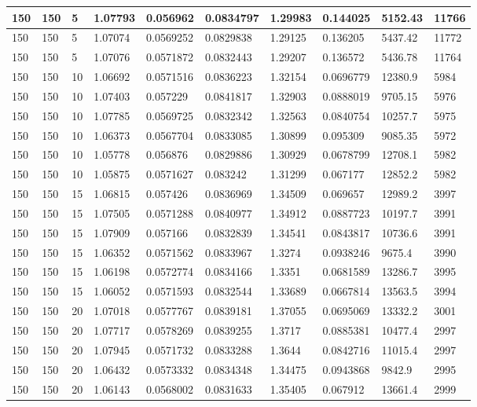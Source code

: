 \begin{landscape}
\begin{longtable}{ | l | l | l | l | l | l | l | l | l | l | }
150 & 150 & 5 & 1.07793 & 0.056962 & 0.0834797 & 1.29983 & 0.144025 & 5152.43 & 11766\\ \hline
150 & 150 & 5 & 1.07074 & 0.0569252 & 0.0829838 & 1.29125 & 0.136205 & 5437.42 & 11772\\ \hline
150 & 150 & 5 & 1.07076 & 0.0571872 & 0.0832443 & 1.29207 & 0.136572 & 5436.78 & 11764\\ \hline
150 & 150 & 10 & 1.06692 & 0.0571516 & 0.0836223 & 1.32154 & 0.0696779 & 12380.9 & 5984\\ \hline
150 & 150 & 10 & 1.07403 & 0.057229 & 0.0841817 & 1.32903 & 0.0888019 & 9705.15 & 5976\\ \hline
150 & 150 & 10 & 1.07785 & 0.0569725 & 0.0832342 & 1.32563 & 0.0840754 & 10257.7 & 5975\\ \hline
150 & 150 & 10 & 1.06373 & 0.0567704 & 0.0833085 & 1.30899 & 0.095309 & 9085.35 & 5972\\ \hline
150 & 150 & 10 & 1.05778 & 0.056876 & 0.0829886 & 1.30929 & 0.0678799 & 12708.1 & 5982\\ \hline
150 & 150 & 10 & 1.05875 & 0.0571627 & 0.083242 & 1.31299 & 0.067177 & 12852.2 & 5982\\ \hline
150 & 150 & 15 & 1.06815 & 0.057426 & 0.0836969 & 1.34509 & 0.069657 & 12989.2 & 3997\\ \hline
150 & 150 & 15 & 1.07505 & 0.0571288 & 0.0840977 & 1.34912 & 0.0887723 & 10197.7 & 3991\\ \hline
150 & 150 & 15 & 1.07909 & 0.057166 & 0.0832839 & 1.34541 & 0.0843817 & 10736.6 & 3991\\ \hline
150 & 150 & 15 & 1.06352 & 0.0571562 & 0.0833967 & 1.3274 & 0.0938246 & 9675.4 & 3990\\ \hline
150 & 150 & 15 & 1.06198 & 0.0572774 & 0.0834166 & 1.3351 & 0.0681589 & 13286.7 & 3995\\ \hline
150 & 150 & 15 & 1.06052 & 0.0571593 & 0.0832544 & 1.33689 & 0.0667814 & 13563.5 & 3994\\ \hline
150 & 150 & 20 & 1.07018 & 0.0577767 & 0.0839181 & 1.37055 & 0.0695069 & 13332.2 & 3001\\ \hline
150 & 150 & 20 & 1.07717 & 0.0578269 & 0.0839255 & 1.3717 & 0.0885381 & 10477.4 & 2997\\ \hline
150 & 150 & 20 & 1.07945 & 0.0571732 & 0.0833288 & 1.3644 & 0.0842716 & 11015.4 & 2997\\ \hline
150 & 150 & 20 & 1.06432 & 0.0573332 & 0.0834348 & 1.34475 & 0.0943868 & 9842.9 & 2995\\ \hline
150 & 150 & 20 & 1.06143 & 0.0568002 & 0.0831633 & 1.35405 & 0.067912 & 13661.4 & 2999\\ \hline

\end{longtable}
\end{landscape}
